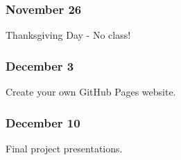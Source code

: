 \documentclass[11pt,]{article}
\begin{document}
\hypertarget{november-26}{%
\subsubsection{November 26}\label{november-26}}

Thanksgiving Day - No class!

\hypertarget{december-3}{%
\subsubsection{December 3}\label{december-3}}

Create your own GitHub Pages website.

\hypertarget{december-10}{%
\subsubsection{December 10}\label{december-10}}

Final project presentations.
\end{document}
